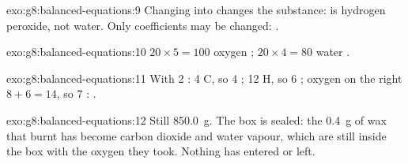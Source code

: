 \begin{solution}{exo:g8:balanced-equations:9}
Changing  into  changes the substance:  is
hydrogen peroxide, not water. Only coefficients may be changed:
.
\end{solution}

\begin{solution}{exo:g8:balanced-equations:10}
$20 \times 5 = 100$ oxygen ; $20 \times 4 = 80$ water
.
\end{solution}

\begin{solution}{exo:g8:balanced-equations:11}
With 2 : 4 C, so 4 ; 12 H, so 6 ; oxygen on the
right $8 + 6 = 14$, so 7 :
.
\end{solution}

\begin{solution}{exo:g8:balanced-equations:12}
Still \qty{850.0}{g}. The box is sealed: the \qty{0.4}{g} of wax that
burnt has become carbon dioxide and water vapour, which are still inside
the box with the oxygen they took. Nothing has entered or left.
\end{solution}


